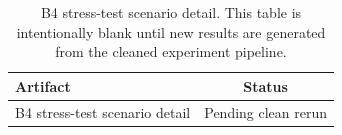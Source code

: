 \begin{table}[!t]
\centering
\footnotesize
\begin{tabular}{@{}lc@{}}
\toprule
Artifact & Status \\
\midrule
B4 stress-test scenario detail & Pending clean rerun \\
\bottomrule
\end{tabular}
\caption{B4 stress-test scenario detail. This table is intentionally blank until new results are generated from the cleaned experiment pipeline.}
\label{tab:b4_detail}
\end{table}
